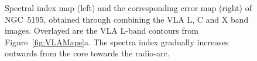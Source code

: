 \documentclass[fleqn,usenatbib]{mnras}
\def\fig{Figure}
\begin{document}
\begin{figure}
{\centering
{} \hspace{2em}

\caption{Spectral index map (left) and the corresponding error map (right) of NGC~5195, obtained through combining the VLA L, C and X band images. Overlayed are the VLA L-band contours from \fig~\ref{fig:VLAMaps}a. The spectra index gradually increases outwards from the core towards the radio-arc.}
\label{fig:Specind}
}
\end{figure}
\end{document}
